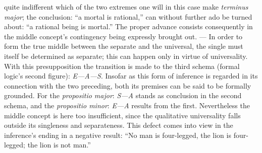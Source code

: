 \documentclass[12pt]{book}
\begin{document}
quite indifferent which of the two extremes one will in this case make
\textit{terminus major}; the conclusion: ``a mortal is rational,'' can
without further ado be turned about: ``a rational being is mortal.'' The
proper advance consists consequently in the middle concept's contingency
being expressly brought out. --- In order to form the true middle between
the separate and the universal, the single must itself be determined as
separate; this can happen only in virtue of universality. With this
presupposition the transition is made to the third schema (formal logic's
second figure): \textit{E---A---S}. Insofar as this form of inference is
regarded in its connection with the two preceding, both its premises can be
said to be formally grounded. For the \textit{propositio major}:
\textit{S---A} stands as conclusion in the second schema, and the
\textit{propositio minor}: \textit{E---A} results from the first.
Nevertheless the middle concept is here too insufficient, since the
qualitative universality falls outside its singleness and separateness. This
defect comes into view in the inference's ending in a negative result: ``No
man is four-legged, the lion is four-legged; the lion is not man.''
\end{document}
